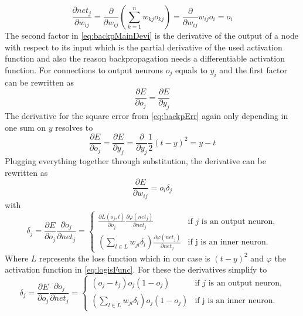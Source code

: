 \begin{equation}\label{eq:backp3s}
  \frac{\partial net_j}{\partial w_{ij}} =  \frac{\partial}{\partial w_{ij}} \left( \sum_{k=1}^n w_{kj} o_{kj} \right) = \frac{\partial}{\partial w_{ij}} w_{ij}o_i = o_i
\end{equation}
The second factor in \autoref{eq:backpMainDevi} is the derivative of the output of a node with respect to its input which is the partial derivative of the used activation function and also the reason backpropagation needs a differentiable activation function.
\newline
For connections to output neurons $o_j$ equals to $y_i$ and the first factor can be rewritten as
\begin{equation}
  \frac{\partial E}{\partial o_j} = \frac{\partial E}{\partial y_j} 
\end{equation}
The derivative for the square error from \autoref{eq:backpErr} again only depending in one sum on $y$ resolves to
\begin{equation}\label{eq:backpResEDev}
  \frac{\partial E}{\partial o_j} = \frac{\partial E}{\partial y_j} =
  \frac{\partial}{\partial y_j} \frac{1}{2}(t-y)^2 = y - t 
\end{equation}
Plugging everything together through substitution, the derivative can be rewritten as 
\begin{equation}
  \frac{\partial E}{\partial w_{ij}} = o_i \delta_j
\end{equation}
with
\begin{equation}
  \delta_j = \frac{\partial E}{\partial o_j}\frac{\partial o_j}{\partial net_j} =
  \begin{cases}
    \frac{\partial L(o_j,t)}{\partial o_j}\frac{\partial \varphi (net_j)}{\partial net_j} & \text{if $j$ is an output neuron,}\\
    (\sum_{l \in L} w_{jl}\delta_l ) \frac{\partial \varphi(net_j)}{\partial net_j} & \text{if j is an inner neuron.}
  \end{cases}
\end{equation}
Where $L$ represents the loss function which in our case is $(t-y)^2$ and $\varphi$ the activation function in \autoref{eq:logisFunc}. For these the derivatives simplify to
\begin{equation}
  \delta_j = \frac{\partial E}{\partial o_j}\frac{\partial o_j}{\partial net_j} =
  \begin{cases}
    (o_j - t_j) o_j (1-o_j) & \text{if $j$ is an output neuron,}\\
    (\sum_{l \in L} w_{jl}\delta_l ) o_j (1-o_j) & \text{if j is an inner neuron.}
  \end{cases}
\end{equation}
